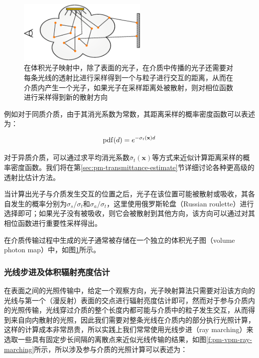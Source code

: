 \begin{figure}
	\sidecaption
	\includegraphics[width=0.55\textwidth]{figures/pm/volumetric-photon-tracing}
	\caption{在体积光子映射中，除了表面的光子，在介质中传播的光子还需要对每条光线的透射比进行采样得到一个与粒子进行交互的距离，从而在介质内产生一个光子，如果光子在采样距离处被散射，则对相位函数进行采样得到新的散射方向}
	\label{f:pm-volumetric-photon-tracing}
\end{figure}

例如对于同质介质，由于其消光系数为常数，其距离采样的概率密度函数可以表述为：

\begin{equation}
	{\rm pdf}(d)=e^{-\sigma_t(\mathbf{x})d}
\end{equation}

对于异质介质，可以通过求平均消光系数$\bar{\sigma}_t(\mathbf{x})$等方式来近似计算距离采样的概率密度函数。我们将在第\ref{sec:pm-transmittance-estimate}节详细讨论各种更高级的透射比估计方法。

当计算出光子与介质发生交互的位置之后，光子在该位置可能被散射或吸收，其各自发生的概率分别为$\sigma_s/\sigma_t$和$\sigma_a/\sigma_t$，这里使用俄罗斯轮盘（Russian roulette）进行选择即可；如果光子没有被吸收，则它会被散射到其他方向，该方向可以通过对其相位函数进行重要性采样得出。

在介质传输过程中生成的光子通常被存储在一个独立的体积光子图（volume photon map）中，如图\ref{f:pm-volumetric-photon-tracing}所示。






\subsubsection{光线步进及体积辐射亮度估计}
在表面之间的光照传输中，给定一个观察方向，光子映射算法只需要对沿该方向的光线与第一个（漫反射）表面的交点进行辐射亮度估计即可，然而对于参与介质内的光照传输，光线穿过介质的整个长度内都可能与介质中的粒子发生交互，从而得到来自向内散射的光照，因此我们需要对整条光线在介质内的部分执行光照计算，这样的计算成本非常昂贵，所以实践上我们常常使用光线步进（ray marching）来选取一些具有固定步长间隔的离散点来近似光线传输的结果，如图\ref{f:pm-vpm-ray-marching}所示，所以涉及参与介质的光照计算可以表述为：

